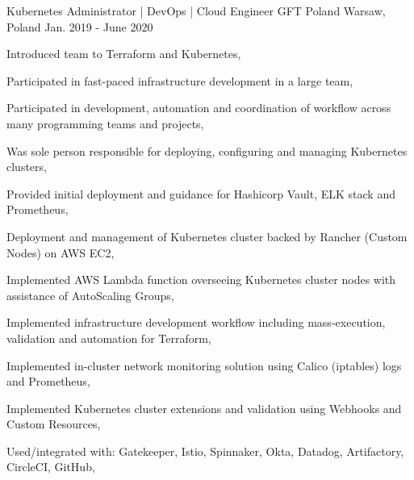 \begin{cventries}
    \cventry
    {Kubernetes Administrator | DevOps | Cloud Engineer} %
    {GFT Poland} %
    {Warsaw, Poland} %
    {Jan. 2019 - June 2020} %
    {
        \begin{cvitems} %
            \item {Introduced team to Terraform and Kubernetes,}
            \item {Participated in fast-paced infrastructure development in a large team,}
            \item {Participated in development, automation and coordination of workflow across many programming teams and projects,}
            \item {Was sole person responsible for deploying, configuring and managing Kubernetes clusters,}
            \item {Provided initial deployment and guidance for Hashicorp Vault, ELK stack and Prometheus,}
            \item {Deployment and management of Kubernetes cluster backed by Rancher (Custom Nodes) on AWS EC2,}
            \item {Implemented AWS Lambda function overseeing Kubernetes cluster nodes with assistance of AutoScaling Groups,}
            \item {Implemented infrastructure development workflow including mass-execution, validation and automation for Terraform,}
            \item {Implemented in-cluster network monitoring solution using Calico (iptables) logs and Prometheus,}
            \item {Implemented Kubernetes cluster extensions and validation using Webhooks and Custom Resources,}
            \item {Used/integrated with: Gatekeeper, Istio, Spinnaker, Okta, Datadog, Artifactory, CircleCI, GitHub,}
        \end{cvitems}
    }


\end{cventries}
